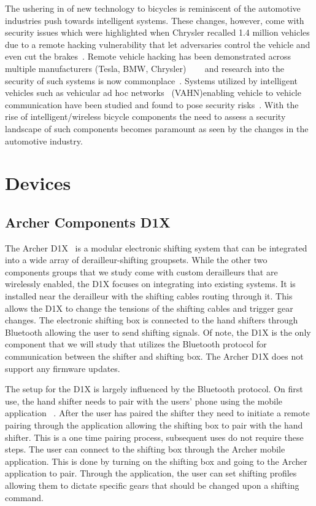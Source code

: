 \documentclass[letterpaper,twocolumn,10pt]{article}
\begin{document}
The ushering in of new technology to bicycles is reminiscent of the automotive industries push towards intelligent systems. These changes, however, come with security issues which were highlighted when Chrysler recalled 1.4 million vehicles due to a remote hacking vulnerability that let adversaries control the vehicle and even cut the brakes~\cite{ChryslerRecall}. Remote vehicle hacking has been demonstrated across multiple manufacturers (Tesla, BMW, Chrysler) ~\cite{Tesla}~\cite{BMW}~\cite{Chrysler} and research into the security of such systems is now commonplace~\cite{dibaei2019overview}. Systems utilized by intelligent vehicles such as vehicular ad hoc networks~\cite{SAKIZ201733} (VAHN)enabling vehicle to vehicle communication have been studied and found to pose security risks~\cite{ SAKIZ201733}. With the rise of intelligent/wireless bicycle components the need to assess a security landscape of such components becomes paramount as seen by the changes in the automotive industry.


\section{Devices}
\subsection{Archer Components D1X}

The Archer D1X~\cite{Archer} is a modular electronic shifting system that can be integrated into a wide array of derailleur-shifting groupsets. While the other two components groups that we study come with custom derailleurs that are wirelessly enabled, the D1X focuses on integrating into existing systems. It is installed near the derailleur with the shifting cables routing through it. This allows the D1X to change the tensions of the shifting cables and trigger gear changes. The electronic shifting box is connected to the hand shifters through Bluetooth allowing the user to send shifting signals. Of note, the D1X is the only component that we will study that utilizes the Bluetooth protocol for communication between the shifter and shifting box. The Archer D1X does not support any firmware updates.

The setup for the D1X is largely influenced by the Bluetooth protocol. On first use, the hand shifter needs to pair with the users' phone using the mobile application~ \cite{ArcherApp}. After the user has paired the shifter they need to initiate a remote pairing through the application allowing the shifting box to pair with the hand shifter. This is a one time pairing process, subsequent uses do not require these steps. The user can connect to the shifting box through the Archer mobile application. This is done by turning on the shifting box and going to the Archer application to pair. Through the application, the user can set shifting profiles allowing them to dictate specific gears that should be changed upon a shifting command.
\end{document}
